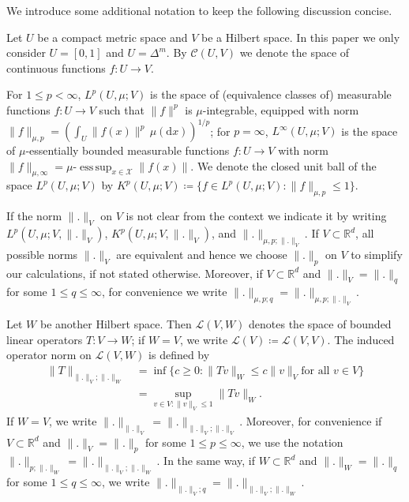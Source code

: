 \documentclass{article}
\DeclareMathOperator*{\esssup}{ess\,sup}
\begin{document}
We introduce some additional notation to keep the following discussion concise.

Let $U$ be a compact metric space and $V$ be a Hilbert space. In this paper we
only consider $U = [0,1]$ and $U = \Delta^m$. By $\mathcal{C}(U, V)$ we denote
the space of continuous functions $f \colon U \to V$.

For $1 \leq p < \infty$, $L^p(U, \mu; V)$ is the space of (equivalence classes
of) measurable functions $f \colon U \to V$ such that $\|f\|^p$ is
$\mu$-integrable, equipped with norm
$\|f\|_{\mu,p} = {(\int_{U} \|f(x)\|^p \,\mu(\mathrm{d}x))}^{1/p}$; for
$p = \infty$, $L^{\infty}(U, \mu; V)$ is the space of $\mu$-essentially bounded
measurable functions $f \colon U \to V$ with norm
$\|f\|_{\mu,\infty} = \mu\text{-}\esssup_{x \in \mathcal{X}} \|f(x)\|$. We denote the
closed unit ball of the space $L^p(U, \mu; V)$ by
$K^p(U, \mu; V) \coloneqq \{f \in L^p(U, \mu; V) \colon \|f\|_{\mu,p} \leq 1\}$.

If the norm $\|.\|_V$ on $V$ is not clear from the context we indicate it by
writing $L^p(U, \mu; V, \|.\|_V)$, $K^p(U, \mu; V, \|.\|_V)$, and
$\|.\|_{\mu,p;\|.\|_V}$. If $V \subset \mathbb{R}^d$, all possible norms
$\|.\|_V$ are equivalent and hence we choose $\|.\|_p$ on $V$ to simplify our
calculations, if not stated otherwise. Moreover, if $V \subset \mathbb{R}^d$
and $\|.\|_V = \|.\|_q$ for some $1 \leq q \leq \infty$, for convenience we
write $\|.\|_{\mu,p;q} = \|.\|_{\mu,p;\|.\|_V}$.

Let $W$ be another Hilbert space. Then $\mathcal{L}(V, W)$ denotes the space of
bounded linear operators $T \colon V \to W$; if $W = V$, we write
$\mathcal{L}(V) \coloneqq \mathcal{L}(V, V)$. The induced operator norm on
$\mathcal{L}(V, W)$ is defined by
\begin{equation*}
  \begin{split}
     \|T\|_{\|.\|_V; \|.\|_W} &= \inf \{ c \geq 0 \colon \|Tv\|_W \leq c \|v\|_V \text{for all } v \in V\} \\
     &= \sup_{v \in V \colon \|v\|_V \leq 1} \|Tv\|_W.
  \end{split}
\end{equation*}
If $W = V$, we write $\|.\|_{\|.\|_V} = \|.\|_{\|.\|_V; \|.\|_V}$. Moreover, for
convenience if $V \subset \mathbb{R}^d$ and $\|.\|_V = \|.\|_p$ for some
$1 \leq p \leq \infty$, we use the notation
$\|.\|_{p;\|.\|_W} = \|.\|_{\|.\|_V; \|.\|_W}$. In the same way, if
$W \subset \mathbb{R}^d$ and $\|.\|_W = \|.\|_q$ for some
$1 \leq q \leq \infty$, we write $\|.\|_{\|.\|_V; q} = \|.\|_{\|.\|_V;\|.\|_W}$.
\end{document}
